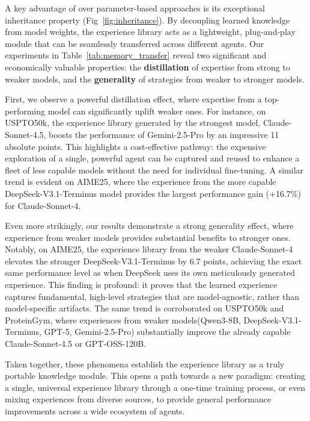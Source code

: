 A key advantage of \method{} over parameter-based approaches is its exceptional inheritance property (Fig~\ref{fig:inheritance}). By decoupling learned knowledge from model weights, the experience library acts as a lightweight, plug-and-play module that can be seamlessly transferred across different agents. Our experiments in Table~\ref{tab:memory_transfer} reveal two significant and economically valuable properties: the \textbf{distillation} of expertise from strong to weaker models, and the \textbf{generality} of strategies from weaker to stronger models.

First, we observe a powerful distillation effect, where expertise from a top-performing model can significantly uplift weaker ones. For instance, on USPTO50k, the experience library generated by the strongest model, Claude-Sonnet-4.5, boosts the performance of Gemini-2.5-Pro by an impressive 11 absolute points. This highlights a cost-effective pathway: the expensive exploration of a single, powerful agent can be captured and reused to enhance a fleet of less capable models without the need for individual fine-tuning. A similar trend is evident on AIME25, where the experience from the more capable DeepSeek-V3.1-Terminus model provides the largest performance gain (+16.7\%) for Claude-Sonnet-4.

Even more strikingly, our results demonstrate a strong generality effect, where experience from weaker models provides substantial benefits to stronger ones. Notably, on AIME25, the experience library from the weaker Claude-Sonnet-4 elevates the stronger DeepSeek-V3.1-Terminus by 6.7 points, achieving the exact same performance level as when DeepSeek uses its own meticulously generated experience. This finding is profound: it proves that the learned experience captures fundamental, high-level strategies that are model-agnostic, rather than model-specific artifacts. The same trend is corroborated on USPTO50k and ProteinGym, where experiences from weaker models(Qwen3-8B, DeepSeek-V3.1-Terminus, GPT-5, Gemini-2.5-Pro) substantially improve the already capable Claude-Sonnet-4.5 or GPT-OSS-120B.



Taken together, these phenomena establish the experience library as a truly portable knowledge module. This opens a path towards a new paradigm: creating a single, universal experience library through a one-time training process, or even mixing experiences from diverse sources, to provide general performance improvements across a wide ecosystem of agents.

